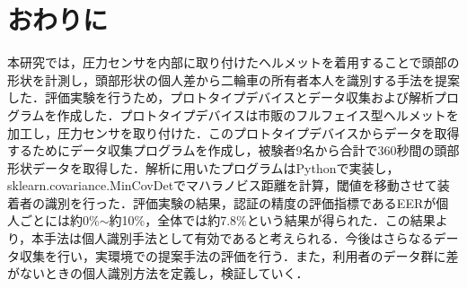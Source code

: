 \documentclass[Japanese,noauthor]{dicomopapers}
\begin{document}
\section{おわりに}
\label{conclude}
本研究では，圧力センサを内部に取り付けたヘルメットを着用することで頭部の形状を計測し，頭部形状の個人差から二輪車の所有者本人を識別する手法を提案した．評価実験を行うため，プロトタイプデバイスとデータ収集および解析プログラムを作成した．プロトタイプデバイスは市販のフルフェイス型ヘルメットを加工し，圧力センサを取り付けた．このプロトタイプデバイスからデータを取得するためにデータ収集プログラムを作成し，被験者9名から合計で360秒間の頭部形状データを取得した．解析に用いたプログラムはPythonで実装し，sklearn.covariance.MinCovDetでマハラノビス距離を計算，閾値を移動させて装着者の識別を行った．評価実験の結果，認証の精度の評価指標であるEERが個人ごとには約0\%$\sim$約10\%，全体では約7.8\%という結果が得られた．この結果より，本手法は個人識別手法として有効であると考えられる．今後はさらなるデータ収集を行い，実環境での提案手法の評価を行う．また，利用者のデータ群に差がないときの個人識別方法を定義し，検証していく．



\end{document}
